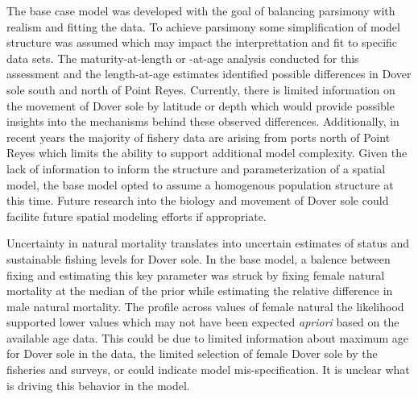 \documentclass[11pt,
  english,
  a4paper,
]{article}
\begin{document}
\leavevmode\tagmcend\tagstructend


The base case model was developed with the goal of balancing parsimony with realism and fitting the data. To achieve parsimony some simplification of model structure was assumed which may impact the interprettation and fit to specific data sets. The maturity-at-length or -at-age analysis conducted for this assessment and the length-at-age estimates identified possible differences in Dover sole south and north of Point Reyes. Currently, there is limited information on the movement of Dover sole by latitude or depth which would provide possible insights into the mechanisms behind these observed differences. Additionally, in recent years the majority of fishery data are arising from ports north of Point Reyes which limits the ability to support additional model complexity. Given the lack of information to inform the structure and parameterization of a spatial model, the base model opted to assume a homogenous population structure at this time. Future research into the biology and movement of Dover sole could facilite future spatial modeling efforts if appropriate.

\leavevmode\tagmcend\tagstructend\par


Uncertainty in natural mortality translates into uncertain estimates of status and sustainable fishing levels for Dover sole. In the base model, a balence between fixing and estimating this key parameter was struck by fixing female natural mortality at the median of the prior while estimating the relative difference in male natural mortality. The profile across values of female natural the likelihood supported lower values which may not have been expected \emph{apriori} based on the available age data. This could be due to limited information about maximum age for Dover sole in the data, the limited selection of female Dover sole by the fisheries and surveys, or could indicate model mis-specification. It is unclear what is driving this behavior in the model.

\leavevmode\tagmcend\tagstructend\par

\end{document}
